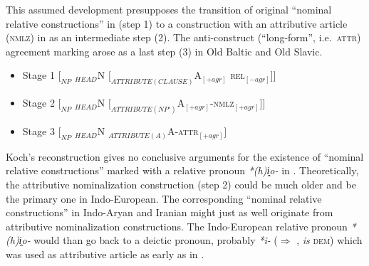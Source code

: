 This assumed development presupposes the transition of original “nominal relative constructions” in  (step 1) to a construction with an attributive article (\textsc{nmlz}) in  as an intermediate step (2). The anti-construct (“long-form”, i.e.~\textsc{attr}) agreement marking arose as a last step (3) in Old Baltic and Old Slavic.
\begin{itemize}
\item Stage 1 $[_{NP}$ $_{HEAD}$N $[_{ATTRIBUTE(CLAUSE)}$A$_{[+{agr}]}$ \textsc{rel}$_{[-{agr}]}$$] ]$
\item Stage 2 $[_{NP}$ $_{HEAD}$N $[_{ATTRIBUTE(NP')}$A$_{[+{agr}]}$-\textsc{nmlz}$_{[+{agr}]}$$] ]$ \label{koch constit nomzr}
\item Stage 3 $[_{NP}$ $_{HEAD}$N $_{ATTRIBUTE(A)}$A-\textsc{attr}$_{[+{agr}]}$$]$
\end{itemize}
Koch's reconstruction gives no conclusive arguments for the existence of “nominal relative constructions” marked with a relative pronoun \textit{*(h)i̭o-} in . Theoretically, the attributive nominalization construction (step 2) could be much older and be the primary one in Indo-European. The corresponding “nominal relative constructions” in Indo-Aryan and Iranian might just as well originate from attributive nominalization constructions. The Indo-European relative pronoun \textit{*(h)i̭o-} would than go back to a deictic pronoun, probably \textit{*i-} ($\Rightarrow$ ,  \textit{is} \textsc{dem}) which was used as attributive article as early as in .


